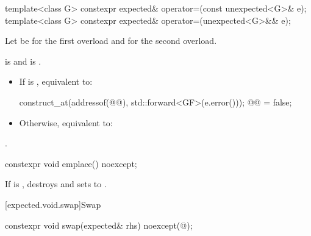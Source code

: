 %
\begin{itemdecl}
template<class G>
  constexpr expected& operator=(const unexpected<G>& e);
template<class G>
  constexpr expected& operator=(unexpected<G>&& e);
\end{itemdecl}

\begin{itemdescr}
\pnum
Let  be  for the first overload and
 for the second overload.

\pnum
\constraints
{} is  and
 is .

\pnum
\effects
\begin{itemize}
\item
If  is , equivalent to:
\begin{codeblock}
construct_at(addressof(@@), std::forward<GF>(e.error()));
@@ = false;
\end{codeblock}
\item
Otherwise, equivalent to:
\end{itemize}

\pnum
\returns
{}.
\end{itemdescr}

%
\begin{itemdecl}
constexpr void emplace() noexcept;
\end{itemdecl}

\begin{itemdescr}
\pnum
\effects
If  is ,
destroys  and sets  to .
\end{itemdescr}

[expected.void.swap]{Swap}

%
\begin{itemdecl}
constexpr void swap(expected& rhs) noexcept(@\seebelow@);
\end{itemdecl}

